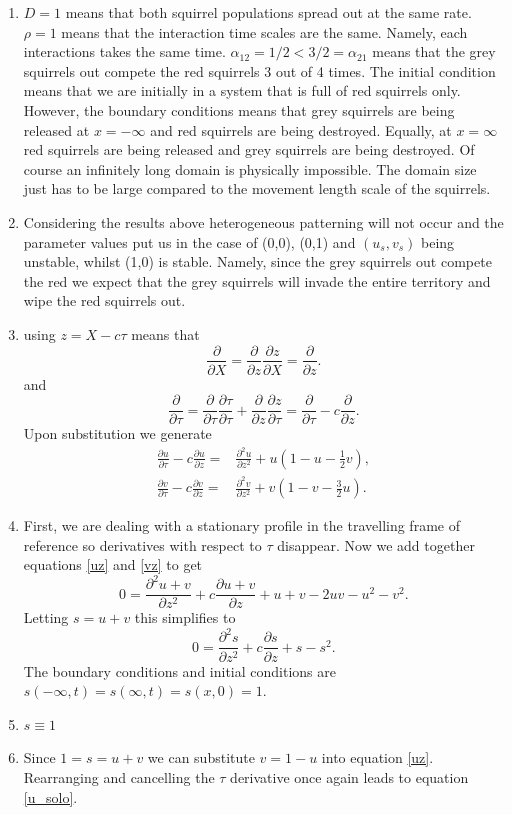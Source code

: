 \documentclass[10pt]{article}
\newcommand{\bb}{\begin{equation}}
\newcommand{\ee}{\end{equation}}
\newcommand{\D}[2]{\frac{\partial #1}{\partial #2}}
\newcommand{\DD}[2]{\frac{\partial^2 #1}{\partial #2^2}}
\newcommand{\eqn}[1]{equation \eqref{#1}}
\newcommand{\eqns}[2]{equations \eqref{#1} and \eqref{#2}}
\renewcommand{\l}{\left(}
\renewcommand{\r}{\right)}
\begin{document}
\begin{Answ}
\begin{enumerate}
\item $D=1$ means that both squirrel populations spread out at the same rate. $\rho=1$ means that the interaction time scales are the same. Namely, each interactions takes the same time. $\alpha_{12}=1/2<3/2=\alpha_{21}$ means that the grey squirrels out compete the red squirrels 3 out of 4 times. The initial condition means that we are initially in a system that is full of red squirrels only. However, the boundary conditions means that grey squirrels are being released at $x=-\infty$ and red squirrels are being destroyed. Equally, at $x=\infty$ red squirrels are being released and grey squirrels are being destroyed. Of course an infinitely long domain is physically impossible. The domain size just has to be large compared to the movement length scale of the squirrels.

\item Considering the results above heterogeneous patterning will not occur and the parameter values put us in the case of (0,0), (0,1) and $(u_s,v_s)$ being unstable, whilst (1,0) is stable. Namely, since the grey squirrels out compete the red we expect that the grey squirrels will invade the entire territory and wipe the red squirrels out.

\item using $z=X-c\tau$ means that
\bb
\D{}{X}=\D{}{z}\D{z}{X}=\D{}{z}.
\ee
and
\bb
\D{}{\tau}=\D{}{\tau}\D{\tau}{\tau}+\D{}{z}\D{z}{\tau}=\D{}{\tau}-c\D{}{z}.
\ee
Upon substitution we generate
\begin{align}
\D{u}{\tau}-c\D{u}{z}=&\DD{u}{z}+u\l 1-u-\frac{1}{2}v\r,\label{uz}\\
\D{v}{\tau}-c\D{v}{z}=&\DD{v}{z}+v\l 1-v-\frac{3}{2}u\r.\label{vz}
\end{align}



\item First, we are dealing with a stationary profile in the travelling frame of reference so derivatives with respect to $\tau$ disappear. Now we add together \eqns{uz}{vz} to get
\bb
0=\DD{u+v}{z}+c\D{u+v}{z}+u+v-2uv-u^2-v^2.
\ee
Letting $s=u+v$ this simplifies to
\bb
0=\DD{s}{z}+c\D{s}{z}+s-s^2.
\ee
The boundary conditions and initial conditions are $s(-\infty,t)=s(\infty,t)=s(x,0)=1$.

\item $s\equiv 1$

\item Since $1=s=u+v$ we can substitute $v=1-u$ into \eqn{uz}. Rearranging and cancelling the $\tau$ derivative once again leads to \eqn{u_solo}.


\end{enumerate}
\end{Answ}
\end{document}

